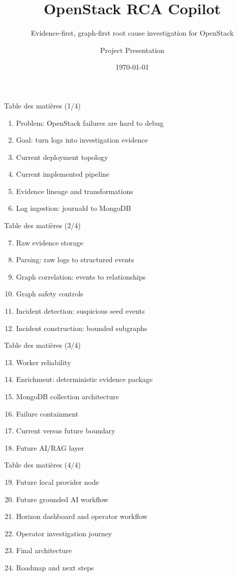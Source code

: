 \documentclass[aspectratio=169,10pt]{beamer}
\title[OpenStack RCA Copilot]{OpenStack RCA Copilot}
\subtitle{Evidence-first, graph-first root cause investigation for OpenStack}
\author{Project Presentation}
\date{\today}
\begin{document}
\begin{frame}
  \titlepage
\end{frame}

\begin{frame}{Table des matières (1/4)}
\small
\begin{enumerate}
  \item Problem: OpenStack failures are hard to debug
  \item Goal: turn logs into investigation evidence
  \item Current deployment topology
  \item Current implemented pipeline
  \item Evidence lineage and transformations
  \item Log ingestion: journald to MongoDB
\end{enumerate}
\end{frame}

\begin{frame}{Table des matières (2/4)}
\small
\begin{enumerate}
  \setcounter{enumi}{6}
  \item Raw evidence storage
  \item Parsing: raw logs to structured events
  \item Graph correlation: events to relationships
  \item Graph safety controls
  \item Incident detection: suspicious seed events
  \item Incident construction: bounded subgraphs
\end{enumerate}
\end{frame}

\begin{frame}{Table des matières (3/4)}
\small
\begin{enumerate}
  \setcounter{enumi}{12}
  \item Worker reliability
  \item Enrichment: deterministic evidence package
  \item MongoDB collection architecture
  \item Failure containment
  \item Current versus future boundary
  \item Future AI/RAG layer
\end{enumerate}
\end{frame}

\begin{frame}{Table des matières (4/4)}
\small
\begin{enumerate}
  \setcounter{enumi}{18}
  \item Future local provider node
  \item Future grounded AI workflow
  \item Horizon dashboard and operator workflow
  \item Operator investigation journey
  \item Final architecture
  \item Roadmap and next steps
\end{enumerate}
\end{frame}
\end{document}
